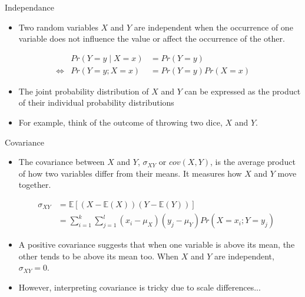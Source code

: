 \documentclass[notes,10pt, aspectratio=169]{beamer}
\begin{document}
\begin{frame}{Independance}
    \begin{itemize}
        \item Two random variables $X$ and $Y$ are independent when the occurrence of one variable does not influence the value or affect the occurrence of the other.\vspace{.3cm}
    \end{itemize}
    \begin{eqnarray*}
        & Pr(Y=y\mid X=x)&= Pr(Y=y)\\
        \Leftrightarrow & Pr(Y=y; X=x)&= Pr(Y=y)Pr(X=x)
    \end{eqnarray*}
    \begin{itemize}
        \item  The joint probability distribution of $X$ and $Y$ can be expressed as the product of their individual probability distributions\vspace{.3cm}
        \item For example, think of the outcome of throwing two dice, $X$ and $Y$. 
    \end{itemize}
\end{frame}

\begin{frame}{Covariance}
    \begin{itemize}
        \item The covariance between $X$ and $Y$, $\sigma_{XY}$ or $cov(X,Y)$, is the average product of how two variables differ from their means. It measures how $X$ and $Y$ move together. 
    \end{itemize}
\begin{eqnarray*}
    &\sigma_{XY} &= \mathbb{E}[(X-\mathbb{E}(X))(Y-\mathbb{E}(Y))]\\
    &  &=\sum^k_{i=1}\sum^l_{j=1} (x_i-\mu_X)(y_j-\mu_Y)Pr(X=x_i; Y=y_j)
\end{eqnarray*} 
 \begin{itemize}
     \item A positive covariance suggests that when one variable is above its mean, the other tends to be above its mean too. When $X$ and $Y$ are independent, $\sigma_{XY}=0$.\vspace{.2cm}
    \item However, interpreting covariance is tricky due to scale differences... 
 \end{itemize}       
\end{frame}
\end{document}
